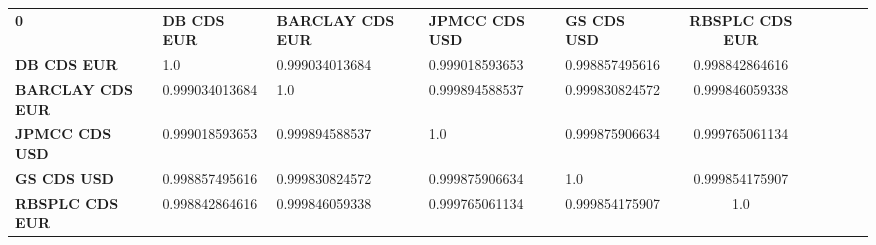 \begin{center}
 \begin{tabular}{|l|l|l|l|l|c|c|c|c|c|}
\hline
\textbf{0} & \textbf{DB CDS EUR} & \textbf{BARCLAY CDS EUR} & \textbf{JPMCC CDS USD} & \textbf{GS CDS USD} & \textbf{RBSPLC CDS EUR}\\\hhline{|=|=|=|=|=|=|}
\textbf{DB CDS EUR} & 1.0 & 0.999034013684 & 0.999018593653 & 0.998857495616 & 0.998842864616\\
\textbf{BARCLAY CDS EUR} & 0.999034013684 & 1.0 & 0.999894588537 & 0.999830824572 & 0.999846059338\\
\textbf{JPMCC CDS USD} & 0.999018593653 & 0.999894588537 & 1.0 & 0.999875906634 & 0.999765061134\\
\textbf{GS CDS USD} & 0.998857495616 & 0.999830824572 & 0.999875906634 & 1.0 & 0.999854175907\\
\textbf{RBSPLC CDS EUR} & 0.998842864616 & 0.999846059338 & 0.999765061134 & 0.999854175907 & 1.0\\
\hline
\end{tabular}
\end{center}